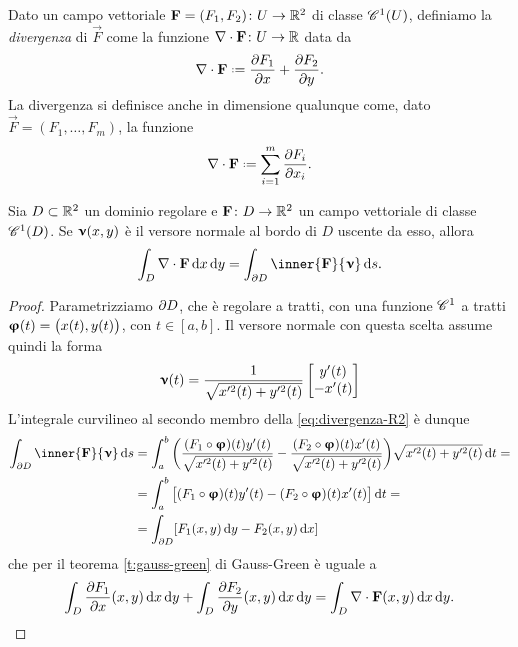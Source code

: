 Dato un campo vettoriale $\vec F=(F_1,F_2)\colon U\to\R^2$ di classe $\cont[1]{U}$, definiamo la \emph{divergenza} di $\vec F$ come la funzione $\div\vec F\colon U\to\R$ data da
\begin{equation}
	\div\vec F\defeq\drp{F_1}{x}+\drp{F_2}{y}.
\end{equation}
La divergenza si definisce anche in dimensione qualunque come, dato $\vec F=(F_1,\dots,F_m)$, la funzione
\begin{equation}
	\div\vec F\defeq\sum_{i=1}^m\drp{F_i}{x_i}.
\end{equation}
\begin{teorema} \label{t:divergenza-R2}
	Sia $D\subset\R^2$ un dominio regolare e $\vec F\colon D\to\R^2$ un campo vettoriale di classe $\cont[1]{D}$.
	Se $\vnu(x,y)$ è il versore normale al bordo di $D$ uscente da esso, allora
	\begin{equation}
		\int_D\div\vec F\,\dd x\,\dd y=\int_{\boundary D}\inner{\vec F}{\vnu}\,\dd s.
		\label{eq:divergenza-R2}
	\end{equation}
\end{teorema}
\begin{proof}
	Parametrizziamo $\boundary D$, che è regolare a tratti, con una funzione $\cclass[1]$ a tratti $\vphi(t)=\big(x(t),y(t)\big)$, con $t\in[a,b]$.
	Il versore normale con questa scelta assume quindi la forma
	\begin{equation*}
		\vnu(t)=\frac1{\sqrt{x'^2(t)+y'^2(t)}}
		\begin{bmatrix}
			y'(t)\\-x'(t)
		\end{bmatrix}
	\end{equation*}
	L'integrale curvilineo al secondo membro della \eqref{eq:divergenza-R2} è dunque
	\begin{equation}
		\begin{split}
			\int_{\boundary D}\inner{\vec F}{\vnu}\,\dd s&=\int_a^b\bigg(\frac{(F_1\circ\vphi)(t)y'(t)}{\sqrt{x'^2(t)+y'^2(t)}}-\frac{(F_2\circ\vphi)(t)x'(t)}{\sqrt{x'^2(t)+y'^2(t)}}\bigg)\sqrt{x'^2(t)+y'^2(t)}\,\dd t=\\
			&=\int_a^b\big[(F_1\circ\vphi)(t)y'(t)-(F_2\circ\vphi)(t)x'(t)\big]\,\dd t=\\
			&=\int_{\boundary D}[F_1(x,y)\,\dd y-F_2(x,y)\,\dd x]
		\end{split}
	\end{equation}
	che per il teorema \ref{t:gauss-green} di Gauss-Green è uguale a
	\begin{equation}
		\int_D\drp{F_1}{x}(x,y)\,\dd x\,\dd y+\int_D\drp{F_2}{y}(x,y)\,\dd x\,\dd y=\int_D\div\vec F(x,y)\,\dd x\,\dd y.\qedhere
	\end{equation}
\end{proof}
